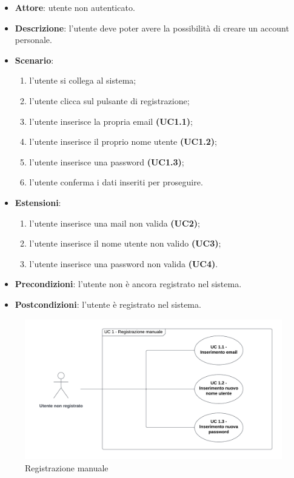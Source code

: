 \begin{itemize}
    \item \textbf{Attore}: utente non autenticato.
    \item \textbf{Descrizione}: l'utente deve poter avere la possibilità di creare un account personale.
    \item \textbf{Scenario}:
    \begin{enumerate}
        \item l'utente si collega al sistema;
        \item l'utente clicca sul pulsante di registrazione;
        \item l'utente inserisce la propria email \textbf{(UC1.1)};
        \item l'utente inserisce il proprio nome utente \textbf{(UC1.2)};
        \item l'utente inserisce una password \textbf{(UC1.3)};
        \item l'utente conferma i dati inseriti per proseguire.
    \end{enumerate}
    \item \textbf{Estensioni}: 
        \begin{enumerate}
            \item l'utente inserisce una mail non valida  \textbf{(UC2)};
            \item l'utente inserisce il nome utente non valido \textbf{(UC3)};
            \item l'utente inserisce una password non valida \textbf{(UC4)}.
        \end{enumerate}

    \item \textbf{Precondizioni}: l'utente non è ancora registrato nel sistema.
    \item \textbf{Postcondizioni}: l'utente è registrato nel sistema.
\end{itemize}

\begin{figure}[!h]
    \includegraphics[width=15cm]{sezioni/Images/UC1_s.png}
    \centering
    \caption{Registrazione manuale}
\end{figure}

